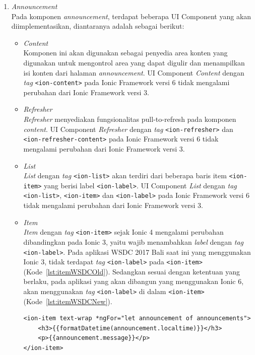 \begin{enumerate}
	\item \textit{Announcement} \\
	Pada komponen \textit{announcement}, terdapat beberapa UI Component yang akan diimplementasikan, diantaranya adalah sebagai berikut:
	\begin{itemize}
		\item \textit{Content} \\
		Komponen ini akan digunakan sebagai penyedia area konten yang digunakan untuk mengontrol area yang dapat digulir dan menampilkan isi konten dari halaman \textit{announcement}. UI Component \textit{Content} dengan \textit{tag} \texttt{<ion-content>} pada Ionic Framework versi 6 tidak mengalami perubahan dari Ionic Framework versi 3. 
		
		\item \textit{Refresher} \\
		\textit{Refresher} menyediakan fungsionalitas  pull-to-refresh pada komponen \textit{content}. UI Component \textit{Refresher} dengan \textit{tag} \texttt{<ion-refresher>} dan \texttt{<ion-refresher-content>} pada Ionic Framework versi 6 tidak mengalami perubahan dari Ionic Framework versi 3.

		\item \textit{List} \\
		\textit{List} dengan \textit{tag} \texttt{<ion-list>} akan terdiri dari beberapa baris item \texttt{<ion-item>} yang berisi label \texttt{<ion-label>}. UI Component \textit{List} dengan \textit{tag} \texttt{<ion-list>}, \texttt{<ion-item>} dan \texttt{<ion-label>} pada Ionic Framework versi 6 tidak mengalami perubahan dari Ionic Framework versi 3.
		
		\item \textit{Item} \\
		\textit{Item} dengan \textit{tag} \texttt{<ion-item>} sejak Ionic 4 mengalami perubahan dibandingkan pada Ionic 3, yaitu wajib menambahkan \textit{label} dengan \textit{tag} \texttt{<ion-label>}. Pada aplikasi WSDC 2017 Bali saat ini yang menggunakan Ionic 3, tidak terdapat \textit{tag} \texttt{<ion-label>} pada \texttt{<ion-item>} (Kode~\ref{lst:itemWSDCOld}). Sedangkan sesuai dengan ketentuan yang berlaku, pada aplikasi yang akan dibangun yang menggunakan Ionic 6, akan menggunakan \textit{tag} \texttt{<ion-label>} di dalam \texttt{<ion-item>} (Kode~\ref{lst:itemWSDCNew}).
		
\begin{lstlisting}[label={lst:itemWSDCOld}, caption=\textit{Tag} \texttt{<ion-item>} dengan Ionic 3 di Aplikasi WSDC 2017 Bali Saat Ini]
<ion-item text-wrap *ngFor="let announcement of announcements">
	<h3>{{formatDatetime(announcement.localtime)}}</h3>
    <p>{{announcement.message}}</p>
</ion-item>
\end{lstlisting}


\end{itemize}
\end{enumerate}
